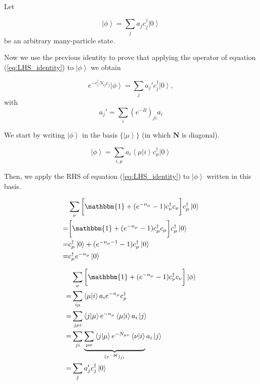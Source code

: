 \documentclass[10pt, twocolumn, twoside]{article}
\begin{document}
Let

\begin{equation}
\left| \phi \right\rangle = \sum_j a_j c_j^\dagger \left| 0 \right\rangle
\end{equation}
be an arbitrary many-particle state. 

Now we use the previous identity to prove that applying the operator of equation (\ref{eq:LHS_identity}) to $\left| \phi \right\rangle$ we obtain

\begin{equation}
e^{-c_i^\dagger N_{ij} c_j} \left| \phi \right\rangle = \sum_j a_j' c_j^\dagger \left| 0 \right\rangle , 
\end{equation}
with
\begin{equation}
a_j' = \sum_{i} (e^{-B})_{ji} a_i
\end{equation}

We start by writing $\left| \phi \right\rangle$ in the basis $\{ \left| \mu \right\rangle \}$ (in which $\bm N$ is diagonal).

\begin{equation}
\left| \phi \right\rangle = \sum_{i,\mu} a_i \left\langle \mu | i \right\rangle c_\mu^\dagger \left| 0 \right\rangle
\end{equation}

Then, we apply the RHS of equation (\ref{eq:LHS_identity}) to $\left| \phi \right\rangle$ written in this basis.

\begin{equation}\label{eq:proofAuxIdentity}
\begin{split}
&\sum_\nu \bigg[ \mathbbm{1} + ( e^{-n_\mu} - 1 ) c_\nu^\dagger c_\nu \bigg] c_\mu^\dagger \left| 0 \right\rangle \\
=&\bigg[ \mathbbm{1} + ( e^{-n_\mu} - 1 ) c_\mu^\dagger c_\mu \bigg] c_\mu^\dagger \left| 0 \right\rangle \\
=& c_\mu^\dagger \left| 0 \right\rangle + (e^{-n_\mu - 1} - 1) c_\mu^\dagger \left| 0 \right\rangle \\
=& c_\mu^\dagger e^{-n_\mu} \left| 0 \right\rangle
\end{split}
\end{equation}

\begin{equation}
\begin{split}
&\sum_\nu \bigg[ \mathbbm{1} + ( e^{-n_\mu} - 1 ) c_\nu^\dagger c_\nu \bigg] \left| \phi \right\rangle \\
=& \sum_{i\mu} \left\langle \mu | i \right\rangle a_i e^{-n_\mu} c_\mu^\dagger \\
=& \sum_{j\mu i} \left\langle j | \mu \right\rangle e^{-n_\mu} \left\langle \mu | i \right\rangle a_i \left| j \right\rangle \\
=& \sum_{j i} \underbrace{\sum_{\mu\nu} \left\langle j | \mu \right\rangle e^{-N_{\mu\nu}} \left\langle \nu | i \right\rangle}_{(e^{-\bm N})_{ji}} a_i \left| j \right\rangle \\
=& \sum_j a_j' c_j^\dagger \left| 0 \right\rangle
\end{split}
\end{equation}
\end{document}
